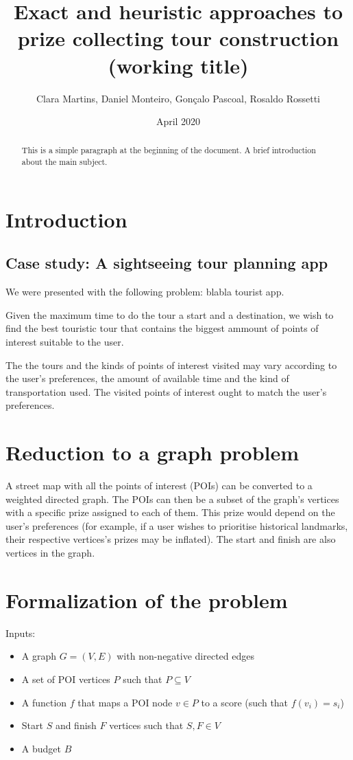 \documentclass{article}
\title{Exact and heuristic approaches to prize collecting tour construction (working title)}
\author{Clara Martins, Daniel Monteiro, Gonçalo Pascoal, Rosaldo Rossetti}
\date{April 2020}
\begin{document}
\maketitle

\begin{abstract}
This is a simple paragraph at the beginning of the 
document. A brief introduction about the main subject.
\end{abstract}

\section{Introduction}

\subsection{Case study: A sightseeing tour planning app}
We were presented with the following problem: blabla tourist app. 

Given the maximum time to do the tour a start and a destination, we wish to find the best touristic tour that contains the biggest ammount of points of interest suitable to the user.

The the tours and the kinds of points of interest visited may vary according to the user's preferences, the amount of available time and the kind of transportation used. The visited points of interest ought to match the user's preferences.

\section{Reduction to a graph problem}

A street map with all the points of interest (POIs) can be converted to a weighted directed graph. The POIs can then be a subset of the graph's vertices with a specific prize assigned to each of them. This prize would depend on the user's preferences (for example, if a user wishes to prioritise historical landmarks, their respective vertices's prizes may be inflated). The start and finish are also vertices in the graph. 

\section{Formalization of the problem}

Inputs:

\begin{itemize}
    \item A graph $G = (V, E)$ with non-negative directed edges
    \item A set of POI vertices $P$ such that $P \subseteq V$
    \item A function $f$ that maps a POI node $v \in P$ to a score (such that $f(v_{i}) = s_{i}$)
    \item Start $S$ and finish $F$ vertices such that $S, F \in V$
    \item A budget $B$
\end{itemize}
\end{document}
